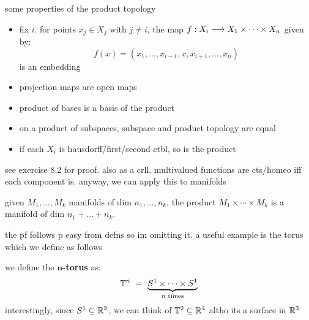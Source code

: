 \begin{prop}
    some properties of the product topology
    \begin{itemize}
        \item fix $ i $. for points $ x_{j} \in X_{j} $ with $ j \neq i $, the
            map $ f:X_{i}\longrightarrow X_{1}\times\cdots\times X_{n} $ given by:
            \begin{equation*}
                f(x)=(x_{1},\dots,x_{i-1},x,x_{i+1},\dots,x_{n})
            \end{equation*}
            is an embedding
        \item projection maps are open maps
        \item product of bases is a basis of the product
        \item on a product of subspaces, subspace and product topology are equal
        \item if each $ X_{i} $ is hausdorff/first/second ctbl, so is the product
    \end{itemize}
\end{prop}

see exercise 8.2 for proof. also as a crll, multivalued functions are cts/homeo
iff each component is. anyway, we can apply this to manifolds

\begin{prop}
    given $ M_{1},\dots,M_{k} $ manifolds of dim $ n_{1},\dots,n_{k} $, the
    product $ M_{1}\times\cdots\times M_{k} $ is a manifold of dim $ n_{1}+\dots
    +n_{k} $.
\end{prop}
the pf follows p easy from defns so im omitting it. a useful example is the torus
which we define as follows

\begin{defn}
    we define the $ \bm{n} $\textbf{-torus} as:
    \begin{equation*}
        \bb{T}^{n} \ = \ \underbrace{S^{1}\times\cdots\times S^{1}}_{n
        \trm{ times}}
    \end{equation*}
    interestingly, since $ S^{1} \subseteq \mathbb{R}^{2} $, we can think of
    $ \mathbb{T}^{2}\subseteq\mathbb{R}^{4} $ altho its a surface in $ \mathbb{R}^{3} $
\end{defn}

